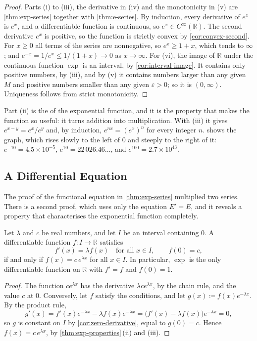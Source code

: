 \begin{proof}
Parts (i) to (iii), the derivative in (iv) and the monotonicity in (v) are \cref{thm:exp-series} together with \cref{thm:e-series}. By induction, every derivative of $e^x$ is $e^x$, and a differentiable function is continuous, so $e^x\in C^\infty(\mathbb R)$. The second derivative $e^x$ is positive, so the function is strictly convex by \cref{cor:convex-second}. For $x\ge0$ all terms of the series are nonnegative, so $e^x\ge1+x$, which tends to $\infty$; and $e^{-x}=1/e^x\le1/(1+x)\to0$ as $x\to\infty$. For (vi), the image of $\mathbb R$ under the continuous function $\exp$ is an interval, by \cref{cor:interval-image}. It contains only positive numbers, by (iii), and by (v) it contains numbers larger than any given $M$ and positive numbers smaller than any given $\varepsilon>0$; so it is $(0,\infty)$. Uniqueness follows from strict monotonicity.
\end{proof}

Part (ii) is the  of the exponential function, and it is the property that makes the function so useful: it turns addition into multiplication. With (iii) it gives $e^{x-y}=e^x/e^y$ and, by induction, $e^{nx}=(e^x)^n$ for every integer $n$.  shows the graph, which rises slowly to the left of $0$ and steeply to the right of it: $e^{-10}=4.5\times10^{-5}$, $e^{10}=22\,026.46\ldots$, and $e^{100}=2.7\times10^{43}$.

\subsection{A Differential Equation}

The proof of the functional equation in \cref{thm:exp-series} multiplied two series. There is a second proof, which uses only the equation $E'=E$, and it reveals a property that characterises the exponential function completely.

\begin{theorem}[The equation $f'=\lambda f$]
\label{thm:exp-ode}
Let $\lambda$ and $c$ be real numbers, and let $I$ be an interval containing $0$. A differentiable function $f\colon I\to\mathbb R$ satisfies
\[
f'(x)=\lambda f(x)\quad\text{for all }x\in I,\qquad f(0)=c,
\]
if and only if $f(x)=c\,e^{\lambda x}$ for all $x\in I$. In particular, $\exp$ is the only differentiable function on $\mathbb R$ with $f'=f$ and $f(0)=1$.
\end{theorem}

\begin{proof}
The function $ce^{\lambda x}$ has the derivative $\lambda ce^{\lambda x}$, by the chain rule, and the value $c$ at $0$. Conversely, let $f$ satisfy the conditions, and let $g(x)\coloneqq f(x)e^{-\lambda x}$. By the product rule,
\[
g'(x)=f'(x)e^{-\lambda x}-\lambda f(x)e^{-\lambda x}=\bigl(f'(x)-\lambda f(x)\bigr)e^{-\lambda x}=0 ,
\]
so $g$ is constant on $I$ by \cref{cor:zero-derivative}, equal to $g(0)=c$. Hence $f(x)=c\,e^{\lambda x}$, by \cref{thm:exp-properties}\,(ii) and (iii).
\end{proof}

